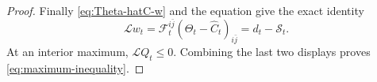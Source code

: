 \documentclass[10pt,a4paper]{amsart}
\begin{document}
\begin{proof}
Finally \eqref{eq:Theta-hatC-w} and the equation give the exact identity
\begin{equation}\label{eq:Lw}
 \mathcal L w_t
 =\mathcal F_t^{i\bar j}(\Theta_t-\widehat C_t)_{i\bar j}
 =d_t-\mathcal S_t.
\end{equation}
At an interior maximum, $\mathcal L Q_t\leq0$. Combining the last two
displays proves \eqref{eq:maximum-inequality}.
\end{proof}
\end{document}
